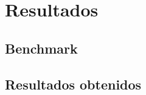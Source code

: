 
\chapter{Resultados}

\section{Benchmark}
\cite{cec_2013_lsgo}

\section{Resultados obtenidos}


\endinput
